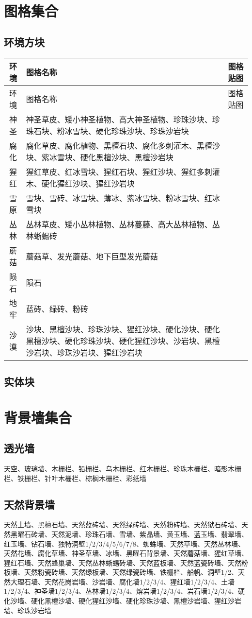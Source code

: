 \section{图格集合}
\subsection{环境方块}
\begin{longtable}{|c|p{}|p{}|}
\hline 环境&图格名称&图格贴图\\\hline
\endfirsthead
\hline 环境&图格名称&图格贴图\\\hline
\endhead
\hline
\endfoot
神圣&神圣草皮、矮小神圣植物、高大神圣植物、珍珠沙块、珍珠石块、粉冰雪块、硬化珍珠沙块、珍珠沙岩块&\\\hline
腐化&腐化草皮、腐化植物、黑檀石块、腐化多刺灌木、黑檀沙块、紫冰雪块、硬化黑檀沙块、黑檀沙岩块&\\\hline
猩红&猩红草皮、红冰雪块、猩红石块、猩红沙块、猩红多刺灌木、硬化猩红沙块、猩红沙岩块&\\\hline
雪原&雪块、雪砖、冰雪块、薄冰、紫冰雪块、粉冰雪块、红冰雪块&\\\hline
丛林&丛林草皮、矮小丛林植物、丛林蔓藤、高大丛林植物、丛林蜥蜴砖&\\\hline
蘑菇&蘑菇草、发光蘑菇、地下巨型发光蘑菇&\\\hline
陨石&陨石&\\\hline
地牢&蓝砖、绿砖、粉砖&\\\hline
沙漠&沙块、黑檀沙块、珍珠沙块、猩红沙块、硬化沙块、硬化黑檀沙块、硬化珍珠沙块、硬化猩红沙块、沙岩块、黑檀沙岩块、珍珠沙岩块、猩红沙岩块
\end{longtable}

\subsection{实体块}


\section{背景墙集合}
\subsection{透光墙}\label{app9}
天空、玻璃墙、木栅栏、铅栅栏、乌木栅栏、红木栅栏、珍珠木栅栏、暗影木栅栏、铁栅栏、针叶木栅栏、棕榈木栅栏、彩纸墙
\subsection{天然背景墙}
天然土墙、黑檀石墙、天然蓝砖墙、天然绿砖墙、天然粉砖墙、天然狱石砖墙、天然黑曜石砖墙、天然泥墙、珍珠石墙、雪墙、紫晶墙、黄玉墙、蓝玉墙、翡翠墙、红玉墙、钻石墙、独特洞壁1/2/3/4/5/6/7/8、蜘蛛墙、天然草墙、天然丛林墙、天然花墙、腐化草墙、神圣草墙、冰墙、黑曜石背景墙、天然蘑菇墙、猩红草墙、猩红石墙、天然蜂巢墙、天然丛林蜥蜴砖墙、天然蓝板墙、天然蓝瓷砖墙、天然粉板墙、天然粉瓷砖墙、天然绿板墙、天然绿瓷砖墙、铁栅栏、船帆、洞壁1/2、天然大理石墙、天然花岗岩墙、沙岩墙、腐化墙1/2/3/4、猩红墙1/2/3/4、土墙1/2/3/4、神圣墙1/2/3/4、丛林墙1/2/3/4、熔岩墙1/2/3/4、岩石墙1/2/3/4、硬化沙墙、硬化黑檀沙墙、硬化猩红沙墙、硬化珍珠沙墙、黑檀沙岩墙、猩红沙岩墙、珍珠沙岩墙

